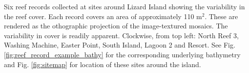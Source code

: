 \label{fig:six_samples} Six reef records collected at sites around Lizard Island showing the variability in the reef cover. Each record covers an area of approximately 110 m$^2$. These are rendered as the othographic projection of the image-textured mosaics. The variability in cover is readily apparent. Clockwise, from top left: North Reef 3, Washing Machine, Easter Point, South Island, Lagoon 2 and Resort. See Fig. \ref{fig:reef_record_example_bathy} for the corresponding underlying bathymetry and Fig. \ref{fig:sitemap} for location of these sites around the island.
